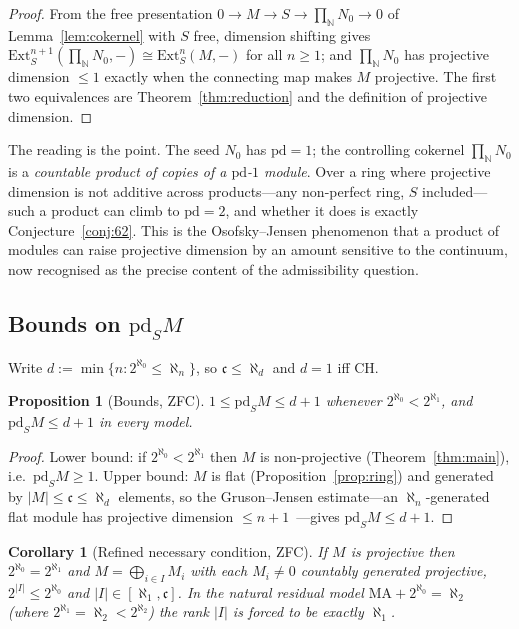 \documentclass[11pt,reqno]{amsart}
\theoremstyle{plain}
\newtheorem{proposition}[theorem]{Proposition}
\newtheorem{corollary}[theorem]{Corollary}
\theoremstyle{definition}
\theoremstyle{remark}
\newcommand{\Ext}{\mathrm{Ext}}
\newcommand{\pd}{\mathrm{pd}}
\newcommand{\N}{\mathbb{N}}
\begin{document}
\begin{proof}
From the free presentation $0\to M\to S\to\prod_{\N}N_0\to0$ of Lemma~\ref{lem:cokernel} with $S$ free, dimension shifting gives $\Ext^{n+1}_S(\prod_{\N}N_0,-)\cong\Ext^{n}_S(M,-)$ for all $n\ge1$; and $\prod_{\N}N_0$ has projective dimension $\le1$ exactly when the connecting map makes $M$ projective. The first two equivalences are Theorem~\ref{thm:reduction} and the definition of projective dimension.
\end{proof}

The reading is the point. The seed $N_0$ has $\pd=1$; the controlling cokernel $\prod_{\N}N_0$ is a \emph{countable product of copies of a $\pd$-$1$ module}. Over a ring where projective dimension is not additive across products---any non-perfect ring, $S$ included---such a product can climb to $\pd=2$, and whether it does is exactly Conjecture~\ref{conj:62}. This is the Osofsky--Jensen phenomenon that a product of modules can raise projective dimension by an amount sensitive to the continuum, now recognised as the precise content of the admissibility question.

\subsection{Bounds on \texorpdfstring{$\pd_S M$}{pd M}}

Write $d:=\min\{n:2^{\aleph_0}\le\aleph_n\}$, so $\mathfrak c\le\aleph_d$ and $d=1$ iff CH.

\begin{proposition}[Bounds, ZFC]\label{prop:pd-bounds}
$1\le\pd_S M\le d+1$ whenever $2^{\aleph_0}<2^{\aleph_1}$, and $\pd_S M\le d+1$ in every model.
\end{proposition}

\begin{proof}
Lower bound: if $2^{\aleph_0}<2^{\aleph_1}$ then $M$ is non-projective (Theorem~\ref{thm:main}), i.e.\ $\pd_S M\ge1$. Upper bound: $M$ is flat (Proposition~\ref{prop:ring}) and generated by $|M|\le\mathfrak c\le\aleph_d$ elements, so the Gruson--Jensen estimate---an $\aleph_n$-generated flat module has projective dimension $\le n+1$~\cite{gruson-jensen}---gives $\pd_S M\le d+1$.
\end{proof}

\begin{corollary}[Refined necessary condition, ZFC]\label{cor:rank}
If $M$ is projective then $2^{\aleph_0}=2^{\aleph_1}$ and $M=\bigoplus_{i\in I}M_i$ with each $M_i\ne0$ countably generated projective, $2^{|I|}\le2^{\aleph_0}$ and $|I|\in[\aleph_1,\mathfrak c]$. In the natural residual model $\mathrm{MA}+2^{\aleph_0}=\aleph_2$ (where $2^{\aleph_1}=\aleph_2<2^{\aleph_2}$) the rank $|I|$ is forced to be \emph{exactly} $\aleph_1$.
\end{corollary}
\end{document}
